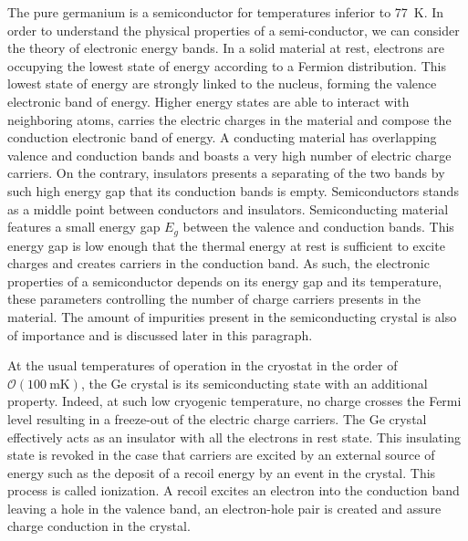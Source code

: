 The pure germanium is a semiconductor for temperatures inferior to \SI{77}{\kelvin}. In order to understand the physical properties of a semi-conductor, we can consider the theory of electronic energy bands. In a solid material at rest, electrons are occupying the lowest state of energy according to a Fermion distribution. This lowest state of energy are strongly linked to the nucleus, forming the valence electronic band of energy. Higher energy states are able to interact with neighboring atoms, carries the electric charges in the material and compose the conduction electronic band of energy. A conducting material has overlapping valence and conduction bands and boasts a very high number of electric charge carriers. On the contrary, insulators presents a separating of the two bands by such high energy gap that its conduction bands is empty. Semiconductors stands as a middle point between conductors and insulators. Semiconducting material features a small energy gap $E_g$ between the valence and conduction bands. This energy gap is low enough that the thermal energy at rest is sufficient to excite charges and creates carriers in the conduction band. As such, the electronic properties of a semiconductor depends on its energy gap and its temperature, these parameters controlling the number of charge carriers presents in the material. The amount of impurities present in the semiconducting crystal is also of importance and is discussed later in this paragraph.

At the usual temperatures of operation in the cryostat in the order of $\mathcal{O}(\SI{100}{\milli\kelvin})$, the Ge crystal is its semiconducting state with an additional property. Indeed, at such low cryogenic temperature, no charge crosses the Fermi level resulting in a freeze-out of the electric charge carriers. The Ge crystal effectively acts as an insulator with all the electrons in rest state. This insulating state is revoked in the case that carriers are excited by an external source of energy such as the deposit of a recoil energy by an event in the crystal. This process is called ionization. A recoil excites an electron into the conduction band leaving a hole in the valence band, an electron-hole pair is created and assure charge conduction in the crystal.

